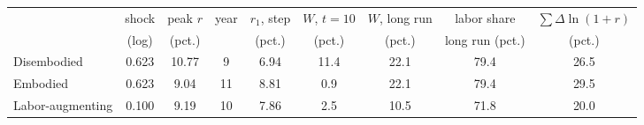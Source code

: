 \begin{tabular}{lcccccccc}\toprule
 & shock & peak $r$ & year & $r_1$, step & $W$, $t{=}10$ & $W$, long run & labor share & $\sum\Delta\ln(1+r)$\\
 & (log) & (pct.) & & (pct.) & (pct.) & (pct.) & long run (pct.) & (pct.)\\\midrule
Disembodied & 0.623 & 10.77 & 9 & 6.94 & 11.4 & 22.1 & 79.4 & 26.5\\
Embodied & 0.623 & 9.04 & 11 & 8.81 & 0.9 & 22.1 & 79.4 & 29.5\\
Labor-augmenting & 0.100 & 9.19 & 10 & 7.86 & 2.5 & 10.5 & 71.8 & 20.0\\
\bottomrule\end{tabular}
